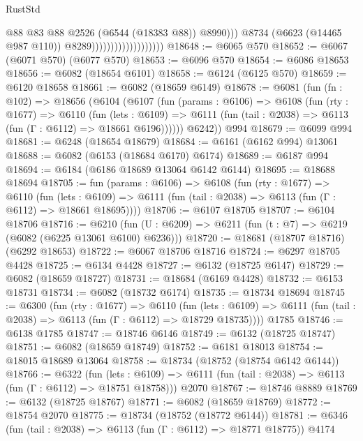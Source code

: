 \begin{lexlean}{RustStd}
\begin{coremodule}
                                                @88
                                                @83
                                                @88
                                                @2526
                                                (@6544 (@18383 @88))
                                                @8990)))
                                          @8734
                                          (@6623 (@14465 @987 @110))
                                          @8289)))))))))))))))))))
@18648 := @6065 @570
@18652 := @6067 (@6071 @570) (@6077 @570)
@18653 := @6096 @570
@18654 := @6086 @18653
@18656 := @6082 (@18654 @6101)
@18658 := @6124 (@6125 @570)
@18659 := @6120 @18658
@18661 := @6082 (@18659 @6149)
@18678 := @6081
    (fun (fn : @102) =>
    @18656
      (@6104
        (@6107
          (fun (params : @6106) =>
          @6108
            (fun (rty : @1677) =>
            @6110
              (fun (lets : @6109) =>
              @6111 (fun (tail : @2038) => @6113 (fun (Γ : @6112) => @18661 @6196))))))
        @6242))
    @994
@18679 := @6099 @994
@18681 := @6248 (@18654 @18679)
@18684 := @6161 (@6162 @994) @13061
@18688 := @6082 (@6153 (@18684 @6170) @6174)
@18689 := @6187 @994
@18694 := @6184 (@6186 @18689 @13064 @6142 @6144)
@18695 := @18688 @18694
@18705 := fun (params : @6106) =>
  @6108
    (fun (rty : @1677) =>
    @6110
      (fun (lets : @6109) =>
      @6111 (fun (tail : @2038) => @6113 (fun (Γ : @6112) => @18661 @18695))))
@18706 := @6107 @18705
@18707 := @6104 @18706
@18716 := @6210
    (fun (U : @6209) => @6211 (fun (t : @7) => @6219 (@6082 (@6225 @13061 @6100) @6236)))
@18720 := @18681 (@18707 @18716) (@6292 @18653)
@18722 := @6067 @18706 @18716
@18724 := @6297 @18705 @4428
@18725 := @6134 @4428
@18727 := @6132 (@18725 @6147)
@18729 := @6082 (@18659 @18727)
@18731 := @18684 (@6169 @4428)
@18732 := @6153 @18731
@18734 := @6082 (@18732 @6174)
@18735 := @18734 @18694
@18745 := @6300
    (fun (rty : @1677) =>
    @6110
      (fun (lets : @6109) =>
      @6111 (fun (tail : @2038) => @6113 (fun (Γ : @6112) => @18729 @18735))))
    @1785
@18746 := @6138 @1785
@18747 := @18746 @6146
@18749 := @6132 (@18725 @18747)
@18751 := @6082 (@18659 @18749)
@18752 := @6181 @18013
@18754 := @18015 @18689 @13064
@18758 := @18734 (@18752 (@18754 @6142 @6144))
@18766 := @6322
    (fun (lets : @6109) => @6111 (fun (tail : @2038) => @6113 (fun (Γ : @6112) => @18751 @18758)))
    @2070
@18767 := @18746 @8889
@18769 := @6132 (@18725 @18767)
@18771 := @6082 (@18659 @18769)
@18772 := @18754 @2070
@18775 := @18734 (@18752 (@18772 @6144))
@18781 := @6346 (fun (tail : @2038) => @6113 (fun (Γ : @6112) => @18771 @18775)) @4174

\end{coremodule}
\end{lexlean}

